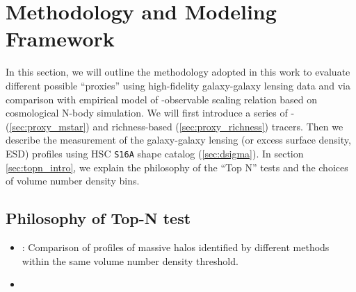 \documentclass[a4paper,fleqn,usenatbib]{mnras}
\begin{document}

\section{Methodology and Modeling Framework}
    \label{sec:method}

    In this section, we will outline the methodology adopted in this work to evaluate different
    possible \mvir{} ``proxies'' using high-fidelity galaxy-galaxy lensing data and via
    comparison with empirical model of \mvir{}-observable scaling relation based on cosmological
    N-body simulation.
    We will first introduce a series of \mstar{}- (\ref{sec:proxy_mstar}) and richness-based
    (\ref{sec:proxy_richness}) \mvir{} tracers.
    Then we describe the measurement of the galaxy-galaxy lensing \dsigma{} (or excess surface
    density, ESD) profiles using HSC \texttt{S16A} shape catalog (\ref{sec:dsigma}).
    In section \ref{sec:topn_intro}, we explain the philosophy of the ``Top N'' tests and the
    choices of volume number density bins. 

\subsection{Philosophy of Top-N test}


    \begin{itemize}

        \item {}: Comparison of \dsigma{} profiles of massive halos
            identified by different methods within the same volume number density threshold.

        

        \item {}

    \end{itemize}


\end{document}
